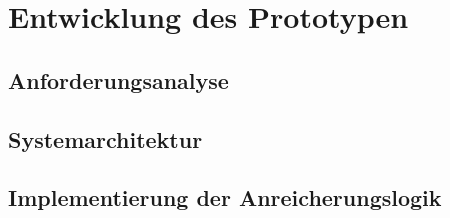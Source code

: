 \section{Entwicklung des Prototypen}
\subsection{Anforderungsanalyse}
\subsection{Systemarchitektur}
\subsection{Implementierung der Anreicherungslogik}